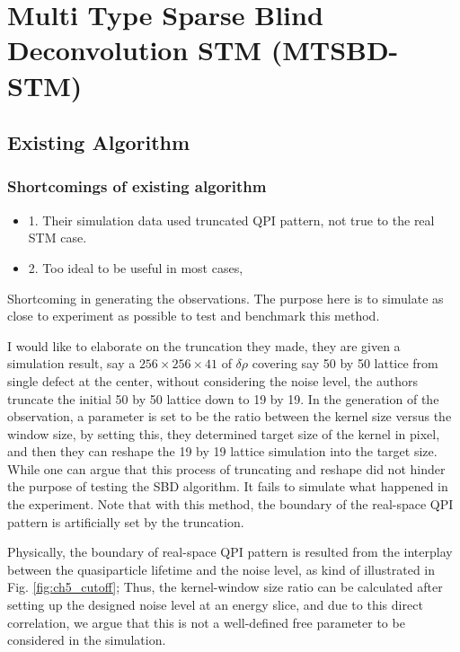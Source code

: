 \chapter{Multi Type Sparse Blind Deconvolution STM (MTSBD-STM)}



\section{Existing Algorithm}
\subsection{Shortcomings of existing algorithm}
\begin{itemize}
	\item 1. Their simulation data used truncated QPI pattern, not true to the real STM case. 
	\item 2. Too ideal to be useful in most cases,
\end{itemize}

Shortcoming in generating the observations. The purpose here is to simulate as close to experiment as possible to test and benchmark this method. 

I would like to elaborate on the truncation they made, they are given a simulation result, say a $256\times256\times41$ of $\delta\rho$ covering say 50 by 50 lattice from single defect at the center, without considering the noise level, the authors truncate the initial 50 by 50 lattice down to 19 by 19. In the generation of the observation, a parameter is set to be the ratio between the kernel size versus the window size, by setting this, they determined target size of the kernel in pixel, and then they can reshape the 19 by 19 lattice simulation into the target size. While one can argue that this process of truncating and reshape did not hinder the purpose of testing the SBD algorithm. It fails to simulate what happened in the experiment. Note that with this method, the boundary of the real-space QPI pattern is artificially set by the truncation.

Physically, the boundary of real-space QPI pattern is resulted from the interplay between the quasiparticle lifetime and the noise level, as kind of illustrated in Fig. \ref{fig:ch5_cutoff}; Thus, the kernel-window size ratio can be calculated after setting up the designed noise level at an energy slice, and due to this direct correlation, we argue that this is not a well-defined free parameter to be considered in the simulation. 

